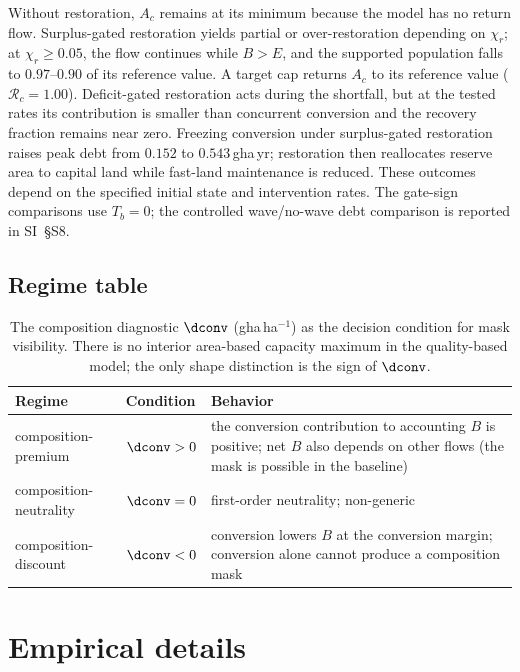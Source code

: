 Without restoration, $A_c$ remains at its minimum because the model has no return flow. Surplus-gated restoration yields partial or over-restoration depending on $\chi_r$; at $\chi_r\ge0.05$, the flow continues while $B>E$, and the supported population falls to $0.97$--$0.90$ of its reference value. A target cap returns $A_c$ to its reference value ($\mathcal R_c=1.00$). Deficit-gated restoration acts during the shortfall, but at the tested rates its contribution is smaller than concurrent conversion and the recovery fraction remains near zero. Freezing conversion under surplus-gated restoration raises peak debt from $0.152$ to $0.543$\,gha\,yr; restoration then reallocates reserve area to capital land while fast-land maintenance is reduced. These outcomes depend on the specified initial state and intervention rates. The gate-sign comparisons use $T_b=0$; the controlled wave/no-wave debt comparison is reported in SI~\S S8.\par\pagebreak

\subsection{Regime table}\label{si:regimes}

\begin{table}[H]
\centering\small
\caption{The composition diagnostic $\dconv$ (gha\,ha$^{-1}$) as the decision condition for mask visibility. There is no interior area-based capacity maximum in the quality-based model; the only shape distinction is the sign of $\dconv$.}
\label{tab:si_regime}
\begin{tabularx}{\textwidth}{l l X}
\toprule
Regime & Condition & Behavior \\
\midrule
composition-premium & $\dconv>0$ & the conversion contribution to accounting $B$ is positive; net $B$ also depends on other flows (the mask is possible in the baseline) \\
composition-neutrality & $\dconv=0$ & first-order neutrality; non-generic \\
composition-discount & $\dconv<0$ & conversion lowers $B$ at the conversion margin; conversion alone cannot produce a composition mask \\
\bottomrule
\end{tabularx}
\end{table}

\section{Empirical details}\label{si:empirical}

